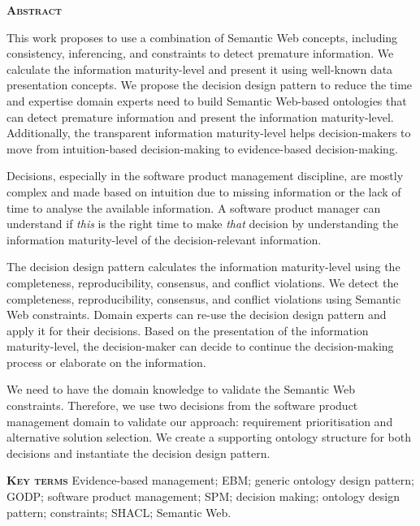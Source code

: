 \thispagestyle{empty}
\begin{center}
\textsc{\normalfont\Huge\bfseries\color{document}Abstract} 
\end{center}
\newcommand{\abstractkey}{This work proposes to use a combination of Semantic Web concepts, including consistency, inferencing, and constraints to detect premature information. We calculate the information maturity-level and present it using well-known data presentation concepts. We propose the decision design pattern to reduce the time and expertise domain experts need to build Semantic Web-based ontologies that can detect premature information and present the information maturity-level. Additionally, the transparent information maturity-level helps decision-makers to move from intuition-based decision-making to evidence-based decision-making.}

\abstractkey 

Decisions, especially in the software product management discipline, are mostly complex and made based on intuition due to missing information or the lack of time to analyse the available information. A software product manager can understand if \emph{this} is the right time to make \emph{that} decision by understanding the information maturity-level of the decision-relevant information.

The decision design pattern calculates the information maturity-level using the completeness, reproducibility, consensus, and conflict violations. We detect the completeness, reproducibility, consensus, and conflict violations using Semantic Web constraints. Domain experts can re-use the decision design pattern and apply it for their decisions. Based on the presentation of the information maturity-level, the decision-maker can decide to continue the decision-making process or elaborate on the information.
 
We need to have the domain knowledge to validate the Semantic Web constraints. Therefore, we use two decisions from the software product management domain to validate our approach: requirement prioritisation and alternative solution selection. We create a supporting ontology structure for both decisions and instantiate the decision design pattern.

\noindent\textsc{\normalfont\large\bfseries\color{document}Key terms} \hfill \break
Evidence-based management; EBM; generic ontology design pattern; GODP; software product management; SPM; decision making; ontology design pattern; constraints; SHACL; Semantic Web.  

\vspace*{\fill} 

